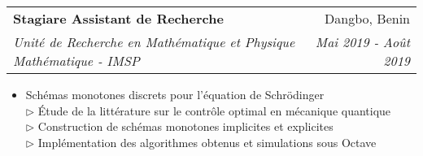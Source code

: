 \documentclass[letterpaper,11pt]{article}
\makeatletter
\newcommand{\resumeItem}[2]{
  \item\small{
    \textbf{#1}{: #2 \vspace{-2pt}}
  }
}
\newcommand{\resumeSubheading}[4]{
  \vspace{-1pt}\item
    \begin{tabular*}{0.97\textwidth}{l@{\extracolsep{\fill}}r}
      \textbf{#1} & #2 \\
      \textit{\small#3} & \textit{\small #4} \\
    \end{tabular*}\vspace{-5pt}
}
\newcommand{\resumeItemListStart}{\begin{itemize}}
\newcommand{\resumeItemListEnd}{\end{itemize}\vspace{-5pt}}
\makeatother
\begin{document}
      \resumeSubheading
	  {Stagiare Assistant de Recherche}{Dangbo, Benin}
	  {Unité de Recherche en Mathématique et Physique Mathématique - IMSP}{Mai 2019 - Août 2019}
	  \resumeItemListStart
	  \item{Schémas monotones discrets pour l'équation de Schrödinger
	  \\{$\rhd$ \small{Étude de la littérature sur le contrôle optimal en mécanique quantique
	  \\$\rhd$ Construction de schémas monotones implicites et explicites
	  \\$\rhd$ Implémentation des algorithmes obtenus et simulations sous Octave}}}
	  \resumeItemListEnd


      

\end{document}
